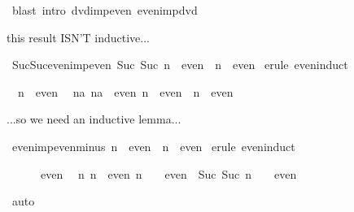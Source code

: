 \begin{isabellebody}
\ {\isacharparenleft}blast\ intro{\isacharcolon}\ dvd{\isacharunderscore}imp{\isacharunderscore}even\ even{\isacharunderscore}imp{\isacharunderscore}dvd{\isacharparenright}%
\begin{isamarkuptext}%
this result ISN'T inductive...%
\end{isamarkuptext}%
\ Suc{\isacharunderscore}Suc{\isacharunderscore}even{\isacharunderscore}imp{\isacharunderscore}even{\isacharcolon}\ {\isachardoublequote}Suc\ {\isacharparenleft}Suc\ n{\isacharparenright}\ {\isasymin}\ even\ {\isasymLongrightarrow}\ n\ {\isasymin}\ even{\isachardoublequote}\isanewline
{}\ {\isacharparenleft}erule\ even{\isachardot}induct{\isacharparenright}%
\begin{isamarkuptxt}%
\begin{isabelle}%
\ {}{\isachardot}\ n\ {\isasymin}\ even\isanewline
\ {}{\isachardot}\ {\isasymAnd}na{\isachardot}\ {\isasymlbrakk}na\ {\isasymin}\ even{\isacharsemicolon}\ n\ {\isasymin}\ even{\isasymrbrakk}\ {\isasymLongrightarrow}\ n\ {\isasymin}\ even%
\end{isabelle}%
\end{isamarkuptxt}%
%
\begin{isamarkuptext}%
...so we need an inductive lemma...%
\end{isamarkuptext}%
\ even{\isacharunderscore}imp{\isacharunderscore}even{\isacharunderscore}minus{\isacharunderscore}{}{\isacharcolon}\ {\isachardoublequote}n\ {\isasymin}\ even\ {\isasymLongrightarrow}\ n{\isacharminus}{\isacharhash}{}\ {\isasymin}\ even{\isachardoublequote}\isanewline
{}\ {\isacharparenleft}erule\ even{\isachardot}induct{\isacharparenright}%
\begin{isamarkuptxt}%
\begin{isabelle}%
\ {}{\isachardot}\ {}\ {\isacharminus}\ {\isacharhash}{}\ {\isasymin}\ even\isanewline
\ {}{\isachardot}\ {\isasymAnd}n{\isachardot}\ {\isasymlbrakk}n\ {\isasymin}\ even{\isacharsemicolon}\ n\ {\isacharminus}\ {\isacharhash}{}\ {\isasymin}\ even{\isasymrbrakk}\ {\isasymLongrightarrow}\ Suc\ {\isacharparenleft}Suc\ n{\isacharparenright}\ {\isacharminus}\ {\isacharhash}{}\ {\isasymin}\ even%
\end{isabelle}%
\end{isamarkuptxt}%
\ auto\isanewline
{}%
\begin{isamarkuptext}%

\end{isamarkuptext}
\end{isabellebody}
